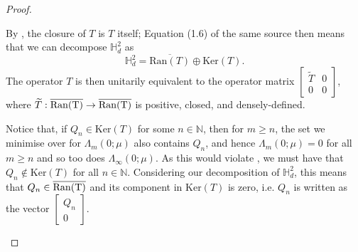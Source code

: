 \documentclass[11pt,reqno]{amsart}
\def\L{\Lambda}
\def\ker{\mathrm{Ker}}
\def\NN{\mathbb{N}}
\def\HH{\mathbb{H}}
\theoremstyle{definition}
\numberwithin{equation}{section}
\renewcommand{\tilde}{\widetilde}
\begin{document}
\begin{proof}
\begin{enumerate}[align=left]
        By \cite[Theorem 1.8]{Sch12}, the closure of \(T\) is \(T\) itself; Equation (1.6) of the same source then means that we can decompose \(\HH_d^2\) as
        \[
            \HH_d^2 = \overline{\mathrm{Ran}(T)} \oplus \ker(T).
        \]
        The operator \(T\) is then unitarily equivalent to the operator matrix \(\begin{bmatrix}\tilde{T} & 0 \\ 0 & 0\end{bmatrix}\), where \(\tilde{T} : \overline{\rm{Ran}(T)} \to \overline{\rm{Ran}(T)}\) is positive, closed, and densely-defined.

        Notice that, if \(Q_n \in \ker(T)\) for some \(n \in \NN\), then for \(m \geq n\), the set we minimise over for \(\L_{m}(0; \mu)\) also contains \(Q_n\), and hence \(\L_{m}(0; \mu) = 0\) for all \(m \geq n\) and so too does \(\L_{\infty}(0; \mu)\). As this would violate , we must have that \(Q_n \not\in \ker( T)\) for all \(n \in \NN\). Considering our decomposition of \(\HH_d^2\), this means that \(Q_n \in \overline{\rm{Ran}(T)}\) and its component in \(\ker(T)\) is zero, i.e. \(Q_n\) is written as the vector \(\begin{bmatrix}Q_n \\ 0\end{bmatrix}\).


\end{enumerate}
\end{proof}
\end{document}
